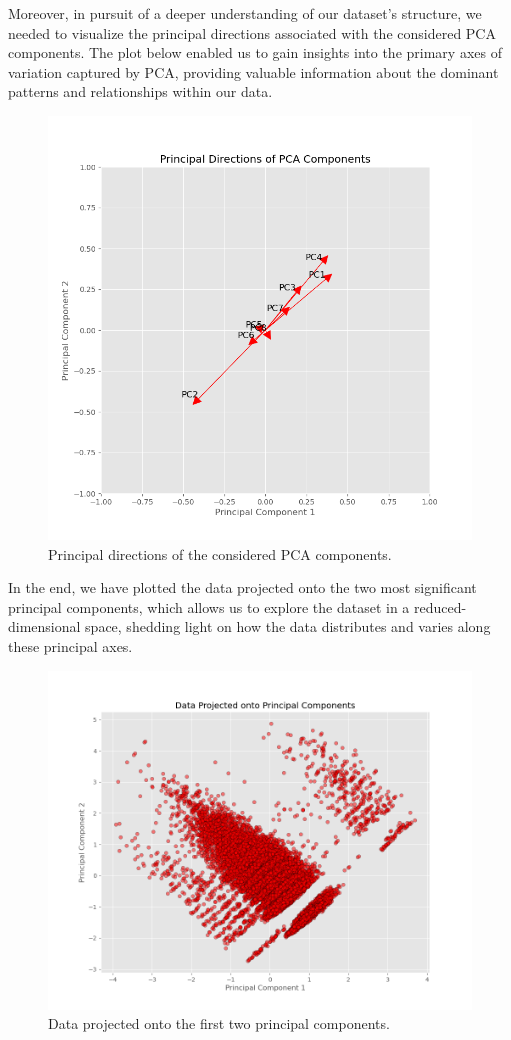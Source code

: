 \documentclass[11pt,a4paper]{article}
\begin{document}
Moreover, in pursuit of a deeper understanding of our dataset's structure, we needed to visualize the principal directions associated with the considered PCA components. The plot below enabled us to gain insights into the primary axes of variation captured by PCA, providing valuable information about the dominant patterns and relationships within our data.

\begin{figure}[H]
    \centering
    \includegraphics[width=0.7\linewidth]{res/plots/pca_components.png}
    \caption{Principal directions of the considered PCA components.}
    \label{fig:/pca_components}
\end{figure}

In the end, we have plotted the data projected onto the two most significant principal components, which allows us to explore the dataset in a reduced-dimensional space, shedding light on how the data distributes and varies along these principal axes.

\begin{figure}[H]
    \centering
    \includegraphics[width=0.7\linewidth]{res/plots/pca_projected.png}
    \caption{Data projected onto the first two principal components.}
    \label{fig:/pca_projected}
\end{figure}
\end{document}
